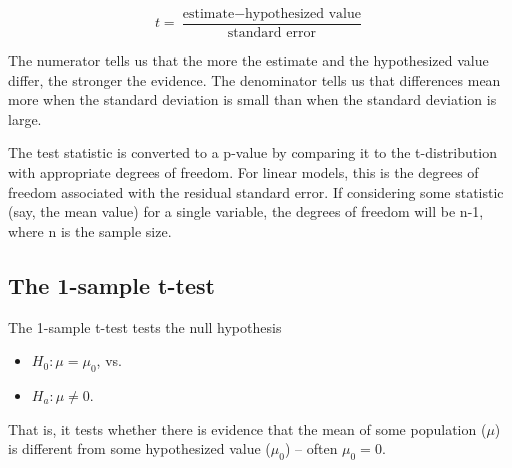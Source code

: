 \documentclass[twoside]{book}\usepackage[]{graphicx}\usepackage[]{xcolor}
\begin{document}
\[
t = \frac{\mbox{estimate} - \mbox{hypothesized value}}{\mbox{standard error}}
\]

The numerator tells us that the more the estimate and the hypothesized value differ, 
the stronger the evidence.  The denominator tells us that differences mean more when the standard
deviation is small than when the standard deviation is large.

The test statistic is converted to a p-value by comparing it to the t-distribution with appropriate
degrees of freedom.  For linear models, this is the degrees of freedom associated with the 
residual standard error.  If considering some statistic (say, the mean value) for a single variable, the degrees of freedom will be n-1, where n is the sample size.

\subsection{The 1-sample t-test}
The 1-sample t-test tests the null hypothesis
\begin{itemize}
	\item $H_0: \mu = \mu_0$, vs.
	\item $H_a: \mu \neq 0$.
\end{itemize}
That is, it tests whether there is evidence that the mean of some population ($\mu$) is different
from some hypothesized value ($\mu_0$) -- often $\mu_0 = 0$.
\end{document}
